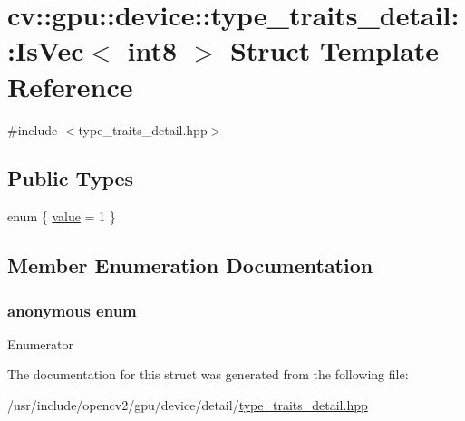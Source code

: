 \hypertarget{structcv_1_1gpu_1_1device_1_1type__traits__detail_1_1IsVec_3_01int8_01_4}{\section{cv\-:\-:gpu\-:\-:device\-:\-:type\-\_\-traits\-\_\-detail\-:\-:Is\-Vec$<$ int8 $>$ Struct Template Reference}
\label{structcv_1_1gpu_1_1device_1_1type__traits__detail_1_1IsVec_3_01int8_01_4}
}


{\ttfamily \#include $<$type\-\_\-traits\-\_\-detail.\-hpp$>$}

\subsection*{Public Types}
\begin{DoxyCompactItemize}
\item 
enum \{ \hyperlink{structcv_1_1gpu_1_1device_1_1type__traits__detail_1_1IsVec_3_01int8_01_4_aa5b8c2514b8eb5057859712bc5f90ab5ac0ebbc3a2604010912394db124398405}{value} = 1
 \}
\end{DoxyCompactItemize}


\subsection{Member Enumeration Documentation}
\hypertarget{structcv_1_1gpu_1_1device_1_1type__traits__detail_1_1IsVec_3_01int8_01_4_aa5b8c2514b8eb5057859712bc5f90ab5}{\subsubsection[{anonymous enum}]{\setlength{\rightskip}{0pt plus 5cm}anonymous enum}}\label{structcv_1_1gpu_1_1device_1_1type__traits__detail_1_1IsVec_3_01int8_01_4_aa5b8c2514b8eb5057859712bc5f90ab5}
\begin{Desc}
\item[Enumerator]\par
\begin{description}
\item[{\em 
\hypertarget{structcv_1_1gpu_1_1device_1_1type__traits__detail_1_1IsVec_3_01int8_01_4_aa5b8c2514b8eb5057859712bc5f90ab5ac0ebbc3a2604010912394db124398405}{value}\label{structcv_1_1gpu_1_1device_1_1type__traits__detail_1_1IsVec_3_01int8_01_4_aa5b8c2514b8eb5057859712bc5f90ab5ac0ebbc3a2604010912394db124398405}
}]\end{description}
\end{Desc}


The documentation for this struct was generated from the following file\-:\begin{DoxyCompactItemize}
\item 
/usr/include/opencv2/gpu/device/detail/\hyperlink{type__traits__detail_8hpp}{type\-\_\-traits\-\_\-detail.\-hpp}\end{DoxyCompactItemize}
